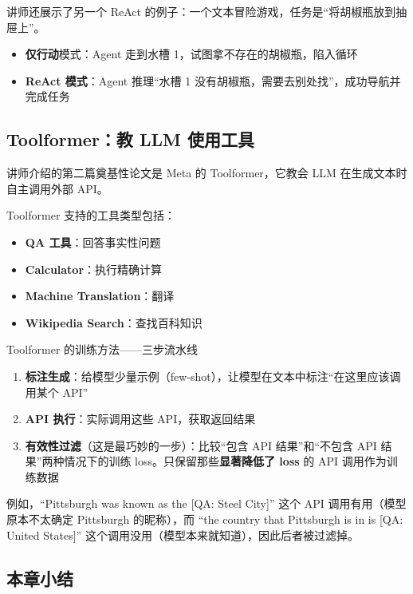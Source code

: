 \documentclass[a4paper]{article}
\begin{document}
讲师还展示了另一个 ReAct 的例子：一个文本冒险游戏，任务是``将胡椒瓶放到抽屉上''。

\begin{itemize}
    \item \textbf{仅行动}模式：Agent 走到水槽 1，试图拿不存在的胡椒瓶，陷入循环
    \item \textbf{ReAct 模式}：Agent 推理``水槽 1 没有胡椒瓶，需要去别处找''，成功导航并完成任务
\end{itemize}

\subsection{Toolformer：教 LLM 使用工具}

讲师介绍的第二篇奠基性论文是 Meta 的 Toolformer，它教会 LLM 在生成文本时自主调用外部 API。

Toolformer 支持的工具类型包括：
\begin{itemize}
    \item \textbf{QA 工具}：回答事实性问题
    \item \textbf{Calculator}：执行精确计算
    \item \textbf{Machine Translation}：翻译
    \item \textbf{Wikipedia Search}：查找百科知识
\end{itemize}

\begin{knowledgebox}{Toolformer 的训练方法——三步流水线}
\begin{enumerate}
    \item \textbf{标注生成}：给模型少量示例（few-shot），让模型在文本中标注``在这里应该调用某个 API''
    \item \textbf{API 执行}：实际调用这些 API，获取返回结果
    \item \textbf{有效性过滤}（这是最巧妙的一步）：比较``包含 API 结果''和``不包含 API 结果''两种情况下的训练 loss。只保留那些\textbf{显著降低了 loss} 的 API 调用作为训练数据
\end{enumerate}
例如，``Pittsburgh was known as the {[}QA: Steel City{]}'' 这个 API 调用有用（模型原本不太确定 Pittsburgh 的昵称），而 ``the country that Pittsburgh is in is {[}QA: United States{]}'' 这个调用没用（模型本来就知道），因此后者被过滤掉。
\end{knowledgebox}

\subsection{本章小结}
\end{document}
